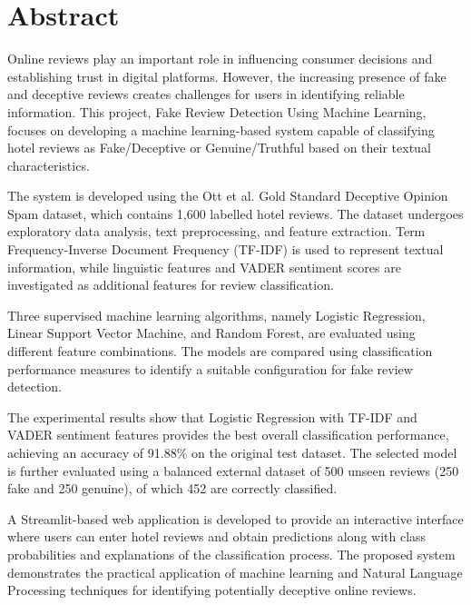 \documentclass[12pt,a4paper]{report}
\begin{document}

\newpage

\chapter*{Abstract}
{}

Online reviews play an important role in influencing
consumer decisions and establishing trust in digital
platforms. However, the increasing presence of fake
and deceptive reviews creates challenges for users
in identifying reliable information. This project,
Fake Review Detection Using Machine Learning,
focuses on developing a machine learning-based
system capable of classifying hotel reviews as
Fake/Deceptive or Genuine/Truthful based on
their textual characteristics.

The system is developed using the Ott et al.
Gold Standard Deceptive Opinion Spam dataset,
which contains 1,600 labelled hotel reviews.
The dataset undergoes exploratory data analysis,
text preprocessing, and feature extraction.
Term Frequency-Inverse Document Frequency
(TF-IDF) is used to represent textual information,
while linguistic features and VADER sentiment
scores are investigated as additional features
for review classification.

Three supervised machine learning algorithms,
namely Logistic Regression, Linear Support Vector
Machine, and Random Forest, are evaluated using
different feature combinations. The models are
compared using classification performance measures
to identify a suitable configuration for fake
review detection.

The experimental results show that Logistic
Regression with TF-IDF and VADER sentiment
features provides the best overall classification
performance, achieving an accuracy of 91.88\%
on the original test dataset. The selected model
is further evaluated using a balanced external
dataset of 500 unseen reviews (250 fake and
250 genuine), of which 452 are correctly classified.

A Streamlit-based web application is developed
to provide an interactive interface where users
can enter hotel reviews and obtain predictions
along with class probabilities and explanations
of the classification process. The proposed
system demonstrates the practical application
of machine learning and Natural Language
Processing techniques for identifying
potentially deceptive online reviews.
\end{document}
